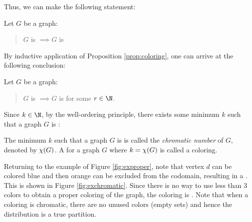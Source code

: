 Thus, we can make the following statement:

\begin{proposition}
  \label{prop:coloring}
  Let \(G\) be a graph:
  \begin{quote}
    \(G\) is  \(\implies G\) is 
  \end{quote}
\end{proposition}

By inductive application of Proposition \ref{prop:coloring}, one can arrive at the following conclusion:

\begin{proposition}
  \label{prop:coloring2}
  Let \(G\) be a graph:
  \begin{quote}
    \(G\) is  \(\implies G\) is  for some \(r\in\N\).
  \end{quote}
\end{proposition}

Since \(k\in\N\), by the well-ordering principle, there exists some minimum \(k\) such that a graph \(G\) is
:

\begin{definition}
  The minimum \(k\) such that a graph \(G\) is  is called the \emph{chromatic number} of \(G\), denoted
  by \(\chi(G)\).  A  for a graph \(G\) where \(k=\chi(G)\) is called a \emph{} coloring.
\end{definition}

Returning to the example  of Figure \ref{fig:exproper}, note that vertex \(d\) can be colored blue and
then orange can be excluded from the codomain, resulting in a .  This is shown in Figure
\ref{fig:exchromatic}.  Since there is no way to use less than 3 colors to obtain a proper coloring of the graph,
the coloring is .  Note that when a coloring is chromatic, there are no unused colors (empty sets) and
hence the distribution is a true partition.

